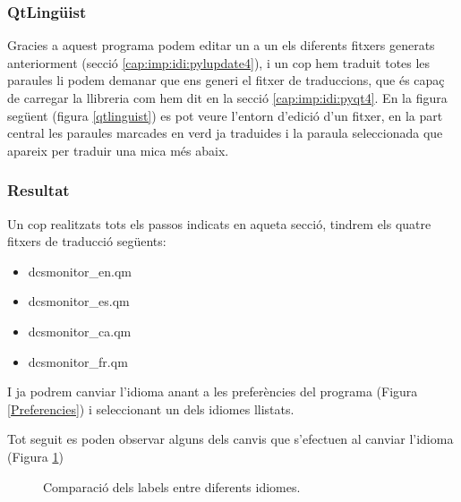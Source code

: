 \subsubsection{QtLingüist}\label{cap:imp:idi:qtlinguist}

Gracies a aquest programa podem editar un a un els diferents fitxers generats anteriorment (secció \ref{cap:imp:idi:pylupdate4}), i un cop hem traduit totes les paraules li podem demanar que ens generi el fitxer de traduccions, que és capaç de carregar la llibreria \PyQT com hem dit en la secció \ref{cap:imp:idi:pyqt4}.
En la figura següent (figura \ref{qtlinguist}) es pot veure l'entorn d'edició d'un fitxer, en la part central les paraules marcades en verd ja traduides i la paraula seleccionada que apareix per traduir una mica més abaix.




\subsubsection{Resultat}\label{cap:imp:idi:res}

Un cop realitzats tots els passos indicats en aqueta secció, tindrem els quatre fitxers de traducció següents:
\begin{itemize}
	\item dcsmonitor\_en.qm
	\item dcsmonitor\_es.qm
	\item dcsmonitor\_ca.qm
	\item dcsmonitor\_fr.qm
\end{itemize}

I ja podrem canviar l'idioma anant a les preferències del programa (Figura \ref{Preferencies}) i seleccionant un dels idiomes llistats.


Tot seguit es poden observar alguns dels canvis que s'efectuen al canviar l'idioma (Figura \ref{fig:comparacio_idiomes})

\begin{figure}[ht!]
	\caption{Comparació dels labels entre diferents idiomes.}
    \label{fig:comparacio_idiomes}
\end{figure}

